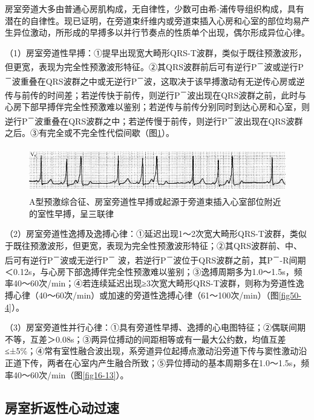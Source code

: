 房室旁道大多由普通心房肌构成，无自律性，少数可由希-浦传导组织构成，具有潜在的自律性。现已证明，在旁道束纤维内或旁道束插入心房和心室的部位均易产生异位激动，所形成的早搏多以并行节奏点的性质单个出现，偶尔形成异位心律。

（1）房室旁道性早搏：①提早出现宽大畸形QRS-T波群，类似于既往预激波形，但更宽，表现为完全性预激波形特征。②其QRS波群前后可有逆行P\textsuperscript{－}波或逆行P\textsuperscript{－}波重叠在QRS波群之中或无逆行P\textsuperscript{－}波，这取决于该早搏激动有无逆传心房或逆传与前传的时间差；若逆传快于前传，则逆行P\textsuperscript{－}波出现在QRS波群之前，此时与心房下部早搏伴完全性预激难以鉴别；若逆传与前传分别同时到达心房和心室，则逆行P\textsuperscript{－}波重叠在QRS波群之中；若逆传慢于前传，则逆行P\textsuperscript{－}波出现在QRS波群之后。③有完全或不完全性代偿间歇（图\ref{fig29-3}）。

\begin{figure}[!htbp]
 \centering
 \includegraphics[width=5.58333in,height=0.79167in]{./images/Image00487.jpg}
 \captionsetup{justification=centering}
 \caption{A型预激综合征、房室旁道性早搏或起源于旁道束插入心室部位附近的室性早搏，呈三联律}
 \label{fig29-3}
  \end{figure} 

（2）房室旁道性逸搏及逸搏心律：①延迟出现1～2次宽大畸形QRS-T波群，类似于既往预激波形，但更宽，表现为完全性预激波形特征；②其QRS波群前、中、后可有逆行P\textsuperscript{－}波或无逆行P\textsuperscript{－} 波，若逆行P\textsuperscript{－}波位于QRS波群之前，其P\textsuperscript{－}-R间期＜0.12s，与心房下部逸搏伴完全性预激难以鉴别；③逸搏周期多为1.0～1.5s，频率40～60次/min；④若连续延迟出现≥3次宽大畸形QRS-T波群，则称为旁道性逸搏心律（40～60次/min）或加速的旁道性逸搏心律（61～100次/min）（图\ref{fig50-4}）。

（3）房室旁道性并行心律：①具有旁道性早搏、逸搏的心电图特征；②偶联间期不等，互差＞0.08s；③两异位搏动的间距相等或有一最大公约数，均值互差≤±5\%；④常有室性融合波出现，系旁道异位起搏点激动沿旁道下传与窦性激动沿正道下传，两者在心室内产生融合所致；⑤异位搏动的基本周期多在1.0～1.5s，频率40～60次/min（图\ref{fig16-13}）。

\protect\hypertarget{text00036.htmlux5cux23subid423}{}{}

\subsection{房室折返性心动过速}

